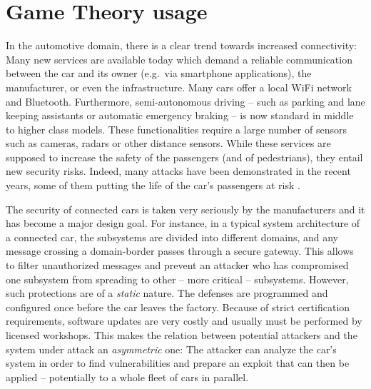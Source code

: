 
\chapter{Game Theory usage} \label{GAMETHEORY}
\smallskip
\hfill
\begin{minipage}[b]{8cm}
\end{minipage}
\vskip 2cm

{\huge I}n the automotive domain, there is a clear trend towards increased connectivity: Many new services are available today which demand a reliable communication between the car and its owner (e.g.~via smartphone applications), the manufacturer, or even the infrastructure. Many cars offer a local WiFi network and Bluetooth. Furthermore, semi-autonomous driving -- such as parking and lane keeping assistants or automatic emergency braking -- is now standard in middle to higher class models. These functionalities require a large number of sensors such as cameras, radars or other distance sensors. While these services are supposed to increase the safety of the passengers (and of pedestrians), they entail new security risks. Indeed, many attacks have been demonstrated in the recent years, some of them putting the life of the car's passengers at risk \cite{smith_car_2016}. 

The security of connected cars is taken very seriously by the manufacturers and it has become a major design goal. For instance, in a typical system architecture of a connected car, the subsystems are divided into different domains, and any message crossing a domain-border passes through a secure gateway. This allows to filter unauthorized messages and prevent an attacker who has compromised one subsystem from spreading to other -- more critical -- subsystems. However, such protections are of a \emph{static} nature. The defenses are programmed and configured once before the car leaves the factory. Because of strict certification requirements, software updates are very costly and usually must be performed by licensed workshops. This makes the relation between potential attackers and the system under attack an \emph{asymmetric} one: The attacker can analyze the car's system in order to find vulnerabilities and prepare an exploit that can then be applied -- potentially to a whole fleet of cars in parallel.   

